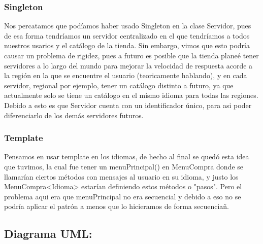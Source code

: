 \documentclass{article}
\begin{document}
\subsubsection*{Singleton}
Nos percatamos que podíamos haber usado Singleton en la clase Servidor, pues de esa forma
tendríamos un servidor centralizado en el que tendríamos a todos nuestros usarios y el catálogo
de la tienda. Sin embargo, vimos que esto podría causar un problema de rigidez, pues a futuro
es posible que la tienda planeé tener servidores a lo largo del mundo para mejorar la velocidad
de respuesta acorde a la región en la que se encuentre el usuario (teoricamente hablando), y
en cada servidor, regional por ejemplo, tener un catálogo distinto a futuro, ya que actualmente
solo se tiene un catálogo en el mismo idioma para todas las regiones. Debido a esto es que
Servidor cuenta con un identificador único, para asi poder diferenciarlo de los demás servidores
futuros.

\subsubsection*{Template}
Pensamos en usar template en los idiomas, de hecho al final se quedó esta idea que tuvimos, la cual fue tener un menuPrincipal() en MenuCompra donde se llamarían ciertos métodos con mensajes al usuario en su idioma, y justo los MenuCompra<Idioma> estarían definiendo estos métodos o "pasos". Pero el problema aqui era que menuPrincipal no era secuencial y debido a eso no se podría aplicar el patrón a menos que lo hicieramos de forma secuenciañ.

\newpage
\subsection*{Diagrama UML:}
\end{document}
